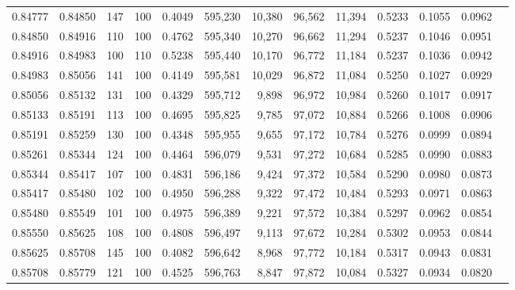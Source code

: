 \begin{tabular}{rrrrrrrrrrrrr}
0.84777 & 0.84850 &   147 & 100 &                                     0.4049 & 595,230 &  10,380 &  96,562 &  11,394 & 0.5233 & 0.1055 & 0.0962 \\
0.84850 & 0.84916 &   110 & 100 &                                     0.4762 & 595,340 &  10,270 &  96,662 &  11,294 & 0.5237 & 0.1046 & 0.0951 \\
0.84916 & 0.84983 &   100 & 110 &                                     0.5238 & 595,440 &  10,170 &  96,772 &  11,184 & 0.5237 & 0.1036 & 0.0942 \\
0.84983 & 0.85056 &   141 & 100 &                                     0.4149 & 595,581 &  10,029 &  96,872 &  11,084 & 0.5250 & 0.1027 & 0.0929 \\
0.85056 & 0.85132 &   131 & 100 &                                     0.4329 & 595,712 &   9,898 &  96,972 &  10,984 & 0.5260 & 0.1017 & 0.0917 \\
0.85133 & 0.85191 &   113 & 100 &                                     0.4695 & 595,825 &   9,785 &  97,072 &  10,884 & 0.5266 & 0.1008 & 0.0906 \\
0.85191 & 0.85259 &   130 & 100 &                                     0.4348 & 595,955 &   9,655 &  97,172 &  10,784 & 0.5276 & 0.0999 & 0.0894 \\
0.85261 & 0.85344 &   124 & 100 &                                     0.4464 & 596,079 &   9,531 &  97,272 &  10,684 & 0.5285 & 0.0990 & 0.0883 \\
0.85344 & 0.85417 &   107 & 100 &                                     0.4831 & 596,186 &   9,424 &  97,372 &  10,584 & 0.5290 & 0.0980 & 0.0873 \\
0.85417 & 0.85480 &   102 & 100 &                                     0.4950 & 596,288 &   9,322 &  97,472 &  10,484 & 0.5293 & 0.0971 & 0.0863 \\
0.85480 & 0.85549 &   101 & 100 &                                     0.4975 & 596,389 &   9,221 &  97,572 &  10,384 & 0.5297 & 0.0962 & 0.0854 \\
0.85550 & 0.85625 &   108 & 100 &                                     0.4808 & 596,497 &   9,113 &  97,672 &  10,284 & 0.5302 & 0.0953 & 0.0844 \\
0.85625 & 0.85708 &   145 & 100 &                                     0.4082 & 596,642 &   8,968 &  97,772 &  10,184 & 0.5317 & 0.0943 & 0.0831 \\
0.85708 & 0.85779 &   121 & 100 &                                     0.4525 & 596,763 &   8,847 &  97,872 &  10,084 & 0.5327 & 0.0934 & 0.0820 \\

\end{tabular}
